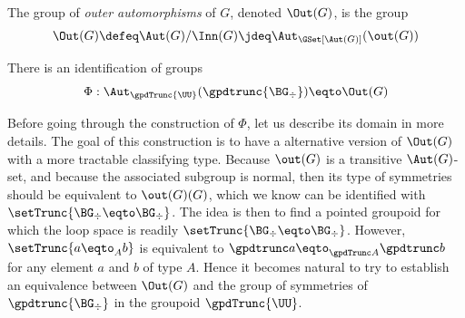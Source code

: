 \begin{definition}
  The group of {\em outer automorphisms} of $G$, denoted $\Out(G)$, is the group
  \begin{displaymath}
    \Out(G) \defeq \Aut(G)/\Inn(G) \jdeq \Aut_{\GSet[\Aut(G)]}(\out(G))
  \end{displaymath}
\end{definition}
\begin{construction}\label{cons:simpler-version-Out}
  There is an identification of groups
  \begin{displaymath}
    \Phi : \Aut_{\gpdTrunc{\UU}}(\gpdtrunc{\BG_\div}) \eqto \Out(G) 
  \end{displaymath}
\end{construction}
Before going through the construction of $\Phi$, let us describe its domain in
more details. The goal of this construction is to have a alternative version of
$\Out(G)$ with a more tractable classifying type. Because $\out(G)$ is a
transitive $\Aut(G)$-set, and because the associated subgroup is normal, then
its type of symmetries should be equivalent to $\out(G)(G)$, which we know can
be identified with $\setTrunc{\BG_\div \eqto \BG_\div}$. The idea is then to
find a pointed groupoid for which the loop space is readily
$\setTrunc{\BG_\div \eqto \BG_\div}$. However, $\setTrunc{a\eqto _Ab}$ is
equivalent to $\gpdtrunc a \eqto_{\gpdTrunc A} \gpdtrunc b$ for any element
$a$ and $b$ of type $A$. Hence it becomes natural to try to establish an
equivalence between $\Out(G)$ and the group of symmetries of
$\gpdtrunc{\BG_\div}$ in the groupoid $\gpdTrunc{\UU}$.
